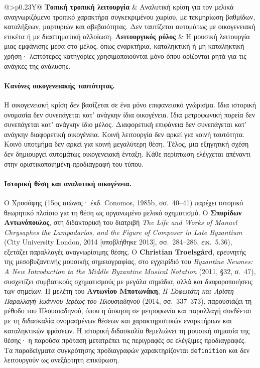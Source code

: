 \documentclass[11pt,a4paper]{article}
\begin{document}
{\begin{xltabular}{\textwidth}{@{}>{\RaggedRight\arraybackslash}p{0.23\textwidth}Y@{}}
\midrule
\textbf{Τοπική τροπική λειτουργία} & Αναλυτική κρίση για τον μελικά αναγνωριζόμενο τροπικό χαρακτήρα συγκεκριμένου χωρίου, με τεκμηρίωση βαθμίδων, καταλήξεων, μαρτυριών και αβεβαιότητας. Δεν ταυτίζεται αυτομάτως με οικογενειακή ετικέτα ή με διαστηματική αλλοίωση.\tabularnewline
\midrule
\textbf{Λειτουργικός ρόλος} & Η μουσική λειτουργία μιας εμφάνισης μέσα στο μέλος, όπως εναρκτήρια, καταληκτική ή μη καταληκτική χρήση· λεπτότερες κατηγορίες χρησιμοποιούνται μόνο όπου ορίζονται ρητά για τις ανάγκες της ανάλυσης.\tabularnewline
\end{xltabular}
}\par

\paragraph{Κανόνες οικογενειακής ταυτότητας.}
Η οικογενειακή κρίση δεν βασίζεται σε ένα μόνο επιφανειακό γνώρισμα. Ίδια ιστορική ονομασία δεν συνεπάγεται κατ' ανάγκην ίδια οικογένεια. Ίδια μετροφωνική πορεία δεν συνεπάγεται κατ' ανάγκην ίδιο μέλος. Διαφορετική επιφάνεια δεν συνεπάγεται κατ' ανάγκην διαφορετική οικογένεια. Κοινή λειτουργία δεν αρκεί για κοινή ταυτότητα. Κοινό υποτμήμα δεν αρκεί για κοινή μεγαλύτερη θέση. Τέλος, μια εξηγητική σχέση δεν δημιουργεί αυτομάτως οικογενειακή ένταξη. Κάθε περίπτωση ελέγχεται απέναντι στην οριστικοποιημένη προδιαγραφή του τύπου.

\paragraph{Ιστορική θέση και αναλυτική οικογένεια.}
Ο Χρυσάφης (15ος αιώνας· έκδ. Conomos, 1985b, σσ.~40--41) παρέχει ιστορικό θεωρητικό πλαίσιο για τη θέση ως οργανωμένο μελικό σχηματισμό. Ο \textbf{Σπυρίδων Αντωνόπουλος}, στη διδακτορική του διατριβή \emph{The Life and Works of Manuel Chrysaphes the Lampadarios, and the Figure of Composer in Late Byzantium} (City University London, 2014 [υποβλήθηκε 2013], σσ.~284--286, εικ.~5.36), εξετάζει παραλλαγές αναγνωρίσιμης θέσης. Ο \textbf{Christian Troelsgård}, ερευνητής της μεσοβυζαντινής μουσικής σημειογραφίας, στο εγχειρίδιό του \emph{Byzantine Neumes: A New Introduction to the Middle Byzantine Musical Notation} (2011, §32, σ.~47), συσχετίζει συμβατικούς σχηματισμούς με μεγάλα σημάδια, αλλά και διαφοροποιήσεις των σημείων. Η μελέτη του \textbf{Αντωνίου Μποτωνάκη}, \emph{Η Σοφωτάτη και Αρίστη Παραλλαγή Ιωάννου Ιερέως του Πλουσιαδηνού} (2014, σσ.~337--373), παρουσιάζει τη μέθοδο του Πλουσιαδηνού, όπου η άσκηση σε μετροφωνία και παραλλαγή συνδέεται με τη διδασκαλία ονομασμένων θέσεων και χαρακτηριστικών εναρκτήριων και καταληκτικών φράσεων. Η ιστορική διδασκαλία θεμελιώνει τη μουσική σημασία της θέσης· η παρούσα πρόταση μετατρέπει τις περιγραφές σε ελέγξιμες προδιαγραφές. Τα παραδείγματα συγκρότησης προδιαγραφών χαρακτηρίζονται \texttt{definition} και δεν λειτουργούν ως ανεξάρτητη επικύρωση.
\end{document}
